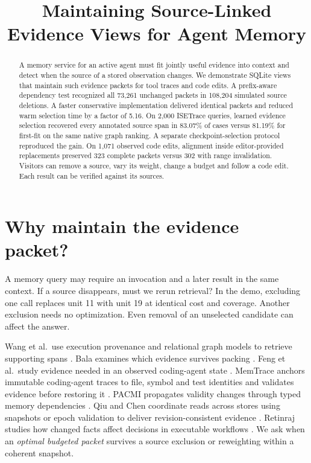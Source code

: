 \documentclass[conference]{IEEEtran}
\title{Maintaining Source-Linked Evidence Views for Agent Memory}
\author{}
\begin{document}
\maketitle
\begin{abstract}
A memory service for an active agent must fit jointly useful evidence into context and detect when the source of a stored observation changes. We demonstrate SQLite views that maintain such evidence packets for tool traces and code edits. A prefix-aware dependency test recognized all 73,261 unchanged packets in 108,204 simulated source deletions. A faster conservative implementation delivered identical packets and reduced warm selection time by a factor of 5.16. On 2,000 ISETrace queries, learned evidence selection recovered every annotated source span in 83.07\% of cases versus 81.19\% for first-fit on the same native graph ranking. A separate checkpoint-selection protocol reproduced the gain. On 1,071 observed code edits, alignment inside editor-provided replacements preserved 323 complete packets versus 302 with range invalidation. Visitors can remove a source, vary its weight, change a budget and follow a code edit. Each result can be verified against its sources.

\end{abstract}

\section{Why maintain the evidence packet?}

A memory query may require an invocation and a later result in the same context. If a source disappears, must we rerun retrieval? In the demo, excluding one call replaces unit 11 with unit 19 at identical cost and coverage. Another exclusion needs no optimization. Even removal of an unselected candidate can affect the answer.

Wang et al.\ use execution provenance and relational graph models to retrieve supporting spans \cite{wang}. Bala examines which evidence survives packing \cite{bala}. Feng et al.\ study evidence needed in an observed coding-agent state \cite{feng}. MemTrace anchors immutable coding-agent traces to file, symbol and test identities and validates evidence before restoring it \cite{memtrace}. PACMI propagates validity changes through typed memory dependencies \cite{pacmi}. Qiu and Chen coordinate reads across stores using snapshots or epoch validation to deliver revision-consistent evidence \cite{readboundaries}. Retinraj studies how changed facts affect decisions in executable workflows \cite{changes}. We ask when an \emph{optimal budgeted packet} survives a source exclusion or reweighting within a coherent snapshot.
\end{document}
